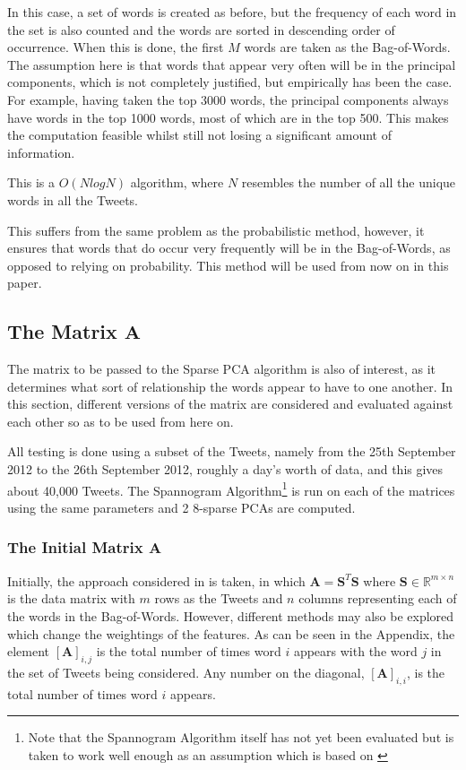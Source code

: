 \documentclass[11pt,a4paper]{article}
\newcommand{\covmat}{\mathbf{A}}
\begin{document}
In this case, a set of words is created as before, but the frequency of each word in the set is also counted and the words are sorted in descending order of occurrence. When this is done, the first $M$ words are taken as the Bag-of-Words. The assumption here is that words that appear very often will be in the principal components, which is not completely justified, but empirically has been the case. For example, having taken the top 3000 words, the principal components always have words in the top 1000 words, most of which are in the top 500. This makes the computation feasible whilst still not losing a significant amount of information.

This is a $O(NlogN)$ algorithm, where $N$ resembles the number of all the unique words in all the Tweets. 

This suffers from the same problem as the probabilistic method, however, it ensures that words that do occur very frequently will be in the Bag-of-Words, as opposed to relying on probability. This method will be used from now on in this paper.

\subsection{The Matrix $\mathbf{A}$}
\label{covmat}

The matrix to be passed to the Sparse PCA algorithm is also of interest, as it determines what sort of relationship the words appear to have to one another. In this section, different versions of the matrix are considered and evaluated against each other so as to be used from here on. 

All testing is done using a subset of the Tweets, namely from the 25th September 2012 to the 26th September 2012, roughly a day's worth of data, and this gives about 40,000 Tweets. The Spannogram Algorithm\footnote{Note that the Spannogram Algorithm itself has not yet been evaluated but is taken to work well enough as an assumption which is based on \cite{dimakis}} is run on each of the matrices using the same parameters and 2 8-sparse PCAs are computed.

\subsubsection{The Initial Matrix $\mathbf{A}$}
Initially, the approach considered in \cite{dimakis} is taken, in which $\mathbf{A} = \mathbf{S}^T \mathbf{S}$ where $\mathbf{S} \in \mathbb{R}^{m \times n}$ is the data matrix with $m$ rows as the Tweets and $n$ columns representing each of the words in the Bag-of-Words. However, different methods may also be explored which change the weightings of the features. As can be seen in the Appendix, the element $[\covmat]_{i, j}$ is the total number of times word $i$ appears with the word $j$ in the set of Tweets being considered. Any number on the diagonal, $[\covmat]_{i, i}$, is the total number of times word $i$ appears. 
\end{document}
